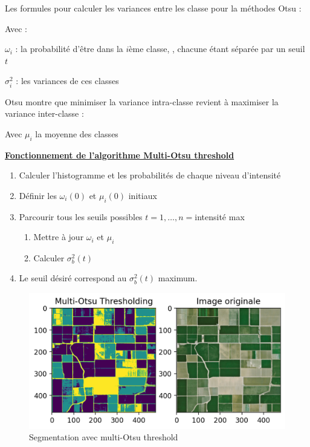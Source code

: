 \documentclass[12pt, openany]{report}
\begin{document}
Les formules pour calculer les variances entre les classe pour la méthodes Otsu :

Avec : 
\begin{mylist}
\item $\omega_i$ : la probabilité d'être dans la $i$ème classe, , chacune étant séparée par un seuil $t$
\item $\sigma_i^2$ : les variances de ces classes
\end{mylist}

Otsu montre que minimiser la variance intra-classe revient à maximiser la variance inter-classe : 

Avec $\mu_i$ la moyenne des classes

\textbf{\underline{Fonctionnement de l’algorithme Multi-Otsu threshold}}

\begin{enumerate}
    \item Calculer l'histogramme et les probabilités de chaque niveau d'intensité
    \item Définir les $\omega_i(0)$  et $\mu_i(0)$ initiaux
    \item Parcourir tous les seuils possibles $t=1,\ldots,n=$intensité max
    \begin{enumerate}
        \item Mettre à jour $\omega_{i}$ et  $\mu_{i}$
        \item Calculer $\sigma_{b}^{2}(t)$
    \end{enumerate}
    \item Le seuil désiré correspond au $\sigma_{b}^{2}(t)$ maximum.
\end{enumerate}



\begin{figure}[H]
\centering
\includegraphics[scale=1.2]{osupng.png}
\caption{Segmentation avec multi-Otsu threshold}
\end{figure}
\end{document}
